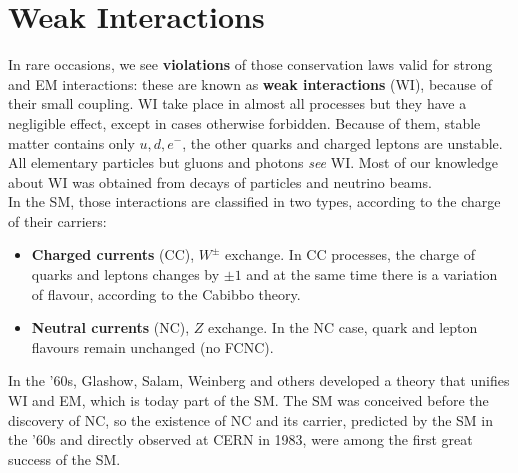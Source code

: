 \documentclass[10.75pt,a4paper,openright,bottom=2cm]{article}
\begin{document}
\section{Weak Interactions}
In rare occasions, we see \textbf{violations} of those conservation laws valid for strong and EM interactions: these are known as \textbf{weak interactions} (WI), because of their small coupling. WI take place in almost all processes but they have a negligible effect, except in cases otherwise forbidden. Because of them, stable matter contains only $u,d,e^-$, the other quarks and charged leptons are unstable. All elementary particles but gluons and photons \textit{see} WI. Most of our knowledge about WI was obtained from decays of particles and neutrino beams.\\
In the SM, those interactions are classified in two types, according to the charge of their carriers:
\begin{itemize}
    \item \textbf{Charged currents} (CC), $W^\pm$ exchange. In CC processes, the charge of quarks and leptons changes by $\pm1$ and at the same time there is a variation of flavour, according to the Cabibbo theory.
    \item \textbf{Neutral currents} (NC), $Z$ exchange. In the NC case, quark and lepton flavours remain unchanged (no FCNC).
\end{itemize}
In the '60s, Glashow, Salam, Weinberg and others developed a theory that unifies WI and EM, which is today part of the SM. The SM was conceived before the discovery of NC, so the existence of NC and its carrier, predicted by the SM in the '60s and directly observed at CERN in 1983, were among the first great success of the SM.
\end{document}
